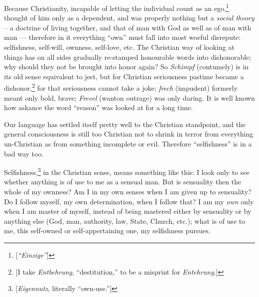 Because Christianity, incapable of letting the individual count as an 
ego,\footnote{[\textit{``Einzige''}]} thought of him only as a dependent, 
and was properly nothing but a \textit{social theory --} a doctrine of living 
together, and that of man with God as well as of man with man --- therefore in 
it everything ``own'' must fall into most woeful disrepute: selfishness, 
self-will, ownness, self-love, etc. The Christian way of looking at things has 
on all sides gradually re-stamped honourable words into dishonorable; why 
should they not be brought into honor again? So \textit{Schimpf} (contumely) 
is in its old sense equivalent to jest, but for Christian seriousness pastime 
became a dishonor,\footnote{[I take \textit{Entbehrung}, ``destitution,'' to 
be a misprint for \textit{Entehrung}.]} for that seriousness cannot take a 
joke; \textit{frech} (impudent) formerly meant only bold, brave; 
\textit{Frevel} (wanton outrage) was only daring. It is well known how askance 
the word ``reason'' was looked at for a long time.

Our language has settled itself pretty well to the Christian standpoint, and 
the general consciousness is still too Christian not to shrink in terror from 
everything un-Christian as from something incomplete or evil. Therefore 
``selfishness'' is in a bad way too.

Selfishness,\footnote{[\textit{Eigennutz}, literally ``own-use.'']} in the 
Christian sense, means something like this: I look only to see whether 
anything is of use to me as a sensual man. But is sensuality then the whole of 
my ownness? Am I in my own senses when I am given up to sensuality? Do I 
follow myself, my own determination, when I follow that? I am my \textit{own} 
only when I am master of myself, instead of being mastered either by 
sensuality or by anything else (God, man, authority, law, State, Church, 
etc.); what is of use to me, this self-owned or self-appertaining one, my 
selfishness pursues.

